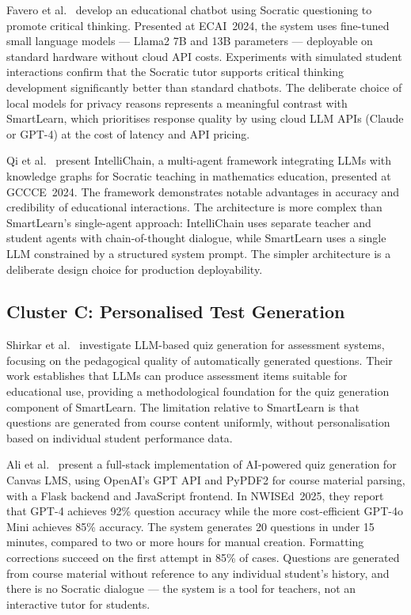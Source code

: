 \documentclass[12pt,a4paper]{report}
\begin{document}
Favero et al.~\cite{ref7} develop an educational chatbot using Socratic questioning to
promote critical thinking. Presented at ECAI~2024, the system uses fine-tuned small
language models --- Llama2 7B and 13B parameters --- deployable on standard hardware
without cloud API costs. Experiments with simulated student interactions confirm that
the Socratic tutor supports critical thinking development significantly better than
standard chatbots. The deliberate choice of local models for privacy reasons represents
a meaningful contrast with SmartLearn, which prioritises response quality by using
cloud LLM APIs (Claude or GPT-4) at the cost of latency and API pricing.

Qi et al.~\cite{ref8} present IntelliChain, a multi-agent framework integrating LLMs
with knowledge graphs for Socratic teaching in mathematics education, presented at
GCCCE~2024. The framework demonstrates notable advantages in accuracy and credibility
of educational interactions. The architecture is more complex than SmartLearn's
single-agent approach: IntelliChain uses separate teacher and student agents with
chain-of-thought dialogue, while SmartLearn uses a single LLM constrained by a
structured system prompt. The simpler architecture is a deliberate design choice for
production deployability.

\subsection{Cluster C: Personalised Test Generation}

Shirkar et al.~\cite{ref9} investigate LLM-based quiz generation for assessment
systems, focusing on the pedagogical quality of automatically generated questions.
Their work establishes that LLMs can produce assessment items suitable for educational
use, providing a methodological foundation for the quiz generation component of
SmartLearn. The limitation relative to SmartLearn is that questions are generated from
course content uniformly, without personalisation based on individual student
performance data.

Ali et al.~\cite{ref10} present a full-stack implementation of AI-powered quiz
generation for Canvas LMS, using OpenAI's GPT API and PyPDF2 for course material
parsing, with a Flask backend and JavaScript frontend. In NWISEd~2025, they report that
GPT-4 achieves 92\% question accuracy while the more cost-efficient GPT-4o Mini achieves
85\% accuracy. The system generates 20 questions in under 15 minutes, compared to two or
more hours for manual creation. Formatting corrections succeed on the first attempt in
85\% of cases. Questions are generated from course material without reference to any
individual student's history, and there is no Socratic dialogue --- the system is a tool
for teachers, not an interactive tutor for students.
\end{document}
